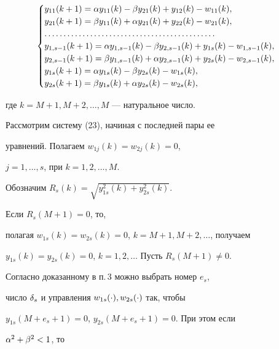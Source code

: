 \begin{equation}


\begin{cases}


y_{11}(k+1) = \a y_{11}(k)-\b y_{21}(k) + y_{12}(k)- w_{11}(k),\\


y_{21}(k+1) = \b y_{11}(k)+ \a y_{21}(k) + y_{22}(k)- w_{21}(k),\\


\dotsc\dotsc\dotsc\dotsc


\dotsc\dotsc\dotsc\dotsc\dotsc\dotsc\dotsc\dotsc\dotsc\dotsc\dotsc \\


y_{1,s-1}(k+1) = \a y_{1,s-1}(k)-\b y_{2,s-1}(k) + y_{1s}(k)-


w_{1,s-1}(k),\\


y_{2,s-1}(k+1) = \b y_{1,s-1}(k)+ \a y_{2,s-1}(k) + y_{2s}(k)-


w_{2,s-1}(k),\\


y_{1s}(k+1) = \a y_{1s}(k)- \b y_{2s}(k) - w_{1s}(k),\\


y_{2s}(k+1) = \b y_{1s}(k)+ \a y_{2s}(k) - w_{2s}(k),


\end{cases}


\end{equation}


где $k = M+1, M+2,\dotsc,M$ --- натуральное число.


Рассмотрим систему (23), начиная с последней пары ее


уравнений. Полагаем $w_{1j}(k) = w_{2j}(k) = 0$,


$j =1,\dotsc,s$, при $ k=1,2,\dotsc, M$.


Обозначим $R_s(k) =\sqrt{y_{1s}^2(k) + y_{2s}^2(k)}$.


Если $R_s(M+1) = 0$, то,


полагая $w_{1s}(k) = w_{2s}(k) = 0$, $k =M+1,M+2,\dotsc$, получаем


$y_{1s}(k) = y_{2s}(k) = 0$, $k=1,2,\dotsc$ Пусть $R_s(M+1) \neq 0$.


Согласно доказанному в п.\,3 можно выбрать номер $e_s$,


число $\delta_s$ и управления $w_{1s}(\cdot), w_{2s}(\cdot)$ так, чтобы


$y_{1s}(M+e_s+1) = 0$, $y_{2s}(M+e_s+1) = 0$. При этом если


$\alpha^2+\beta^2 < 1$, то


